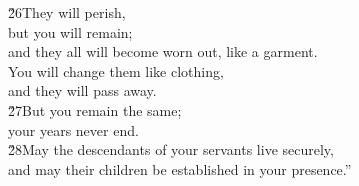 \begin{poetry}
\poeml \v{26}They will perish, \\
\poemll    but you will remain; \\
\poeml and they all will become worn out, like a garment. \\
\poemll    You will change them like clothing, \\
\poemlll       and they will pass away. \\
\poeml \v{27}But you remain the same; \\
\poemll    your years never end. \\
\poeml \v{28}May the descendants of your servants live securely, \\
\poemll    and may their children be established in your presence.''
\end{poetry}

